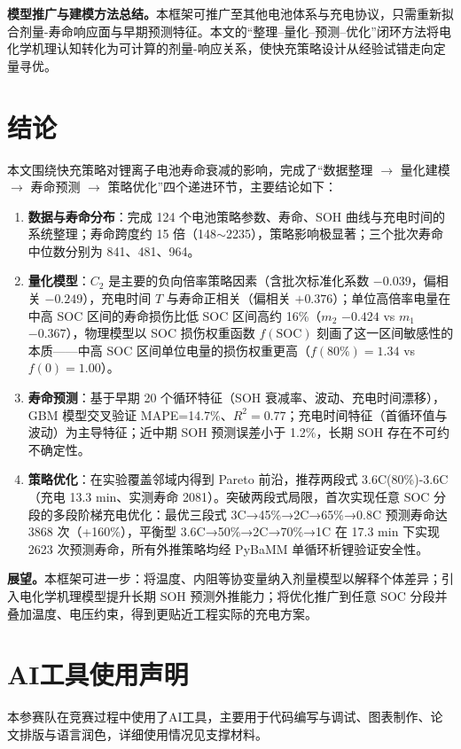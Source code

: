 \documentclass[withoutpreface]{cumcmthesis}
\begin{document}
\textbf{模型推广与建模方法总结。}本框架可推广至其他电池体系与充电协议，只需重新拟合剂量-寿命响应面与早期预测特征。本文的“整理--量化--预测--优化”闭环方法将电化学机理认知转化为可计算的剂量-响应关系，使快充策略设计从经验试错走向定量寻优。

\section{结论}

本文围绕快充策略对锂离子电池寿命衰减的影响，完成了“数据整理 $\rightarrow$ 量化建模 $\rightarrow$ 寿命预测 $\rightarrow$ 策略优化”四个递进环节，主要结论如下：

\begin{enumerate}
\item \textbf{数据与寿命分布}：完成 124 个电池策略参数、寿命、SOH 曲线与充电时间的系统整理；寿命跨度约 15 倍（148$\sim$2235），策略影响极显著；三个批次寿命中位数分别为 841、481、964。
\item \textbf{量化模型}：$C_2$ 是主要的负向倍率策略因素（含批次标准化系数 $-0.039$，偏相关 $-0.249$），充电时间 $T$ 与寿命正相关（偏相关 $+0.376$）；单位高倍率电量在中高 SOC 区间的寿命损伤比低 SOC 区间高约 16\%（$m_2$ $-0.424$ vs $m_1$ $-0.367$），物理模型以 SOC 损伤权重函数 $f(\mathrm{SOC})$ 刻画了这一区间敏感性的本质——中高 SOC 区间单位电量的损伤权重更高（$f(80\%)=1.34$ vs $f(0)=1.00$）。
\item \textbf{寿命预测}：基于早期 20 个循环特征（SOH 衰减率、波动、充电时间漂移），GBM 模型交叉验证 MAPE=14.7\%、$R^2=0.77$；充电时间特征（首循环值与波动）为主导特征；近中期 SOH 预测误差小于 1.2\%，长期 SOH 存在不可约不确定性。
\item \textbf{策略优化}：在实验覆盖邻域内得到 Pareto 前沿，推荐两段式 3.6C(80\%)-3.6C（充电 13.3 min、实测寿命 2081）。突破两段式局限，首次实现任意 SOC 分段的多段阶梯充电优化：最优三段式 3C→45\%→2C→65\%→0.8C 预测寿命达 3868 次（+160\%），平衡型 3.6C→50\%→2C→70\%→1C 在 17.3 min 下实现 2623 次预测寿命，所有外推策略均经 PyBaMM 单循环析锂验证安全性。
\end{enumerate}

\textbf{展望。}本框架可进一步：将温度、内阻等协变量纳入剂量模型以解释个体差异；引入电化学机理模型提升长期 SOH 预测外推能力；将优化推广到任意 SOC 分段并叠加温度、电压约束，得到更贴近工程实际的充电方案。

\section*{AI工具使用声明}
本参赛队在竞赛过程中使用了AI工具，主要用于代码编写与调试、图表制作、论文排版与语言润色，详细使用情况见支撑材料。
\end{document}
